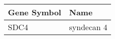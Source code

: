 \begin{tabular}{ll}
\toprule
Gene Symbol &       Name \\
\midrule
       SDC4 & syndecan 4 \\
\bottomrule
\end{tabular}
